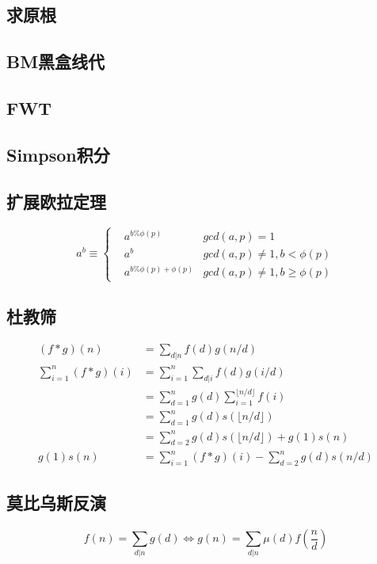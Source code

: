 \documentclass{ctexart}
\begin{document}
\subsection{求原根}

\subsection{BM黑盒线代}

\subsection{FWT}

\subsection{Simpson积分}

\subsection{扩展欧拉定理}
\begin{equation}
a^b\equiv \left\{
\begin{aligned}
& a^{b\%\phi(p)}&  gcd(a,p)=1\\
& a^b           &  gcd(a,p)\neq1,b<\phi(p)\\
& a^{b\%\phi(p)+\phi(p)} & gcd(a,p)\neq1,b\geq\phi(p)
\end{aligned}
\right.
\end{equation}

\subsection{杜教筛}
\begin{align*}
	(f*g)(n)&=\sum_{d|n}f(d)g(n/d) \\
	\sum_{i=1}^n(f*g)(i) &= \sum_{i=1}^n\sum_{d|i}f(d)g(i/d) \\
	&= \sum_{d=1}^ng(d)\sum_{i=1}^{\lfloor n/d\rfloor}f(i) \\
	&= \sum_{d=1}^ng(d)s(\lfloor n/d \rfloor) \\
	&= \sum_{d=2}^ng(d)s(\lfloor n/d \rfloor)+g(1)s(n) \\
	g(1)s(n) &=\sum_{i=1}^n(f*g)(i)-\sum_{d=2}^ng(d)s(n/d)
\end{align*}



\subsection{莫比乌斯反演}
$$ f(n)=\sum_{d|n}g(d) \Longleftrightarrow g(n)=\sum_{d|n}\mu(d)f(\frac{n}{d}) $$
\end{document}
